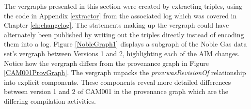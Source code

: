 \begin{figure}
	\centering
\end{figure}
The \glspl{vergraph} presented in this section were created by extracting triples, using the code in Appendix \ref{extractor} from the associated \gls{log} which was covered in Chapter \ref{ch:changelog}.
The statements making up the \gls{vergraph} could have alternately been published by writing out the triples directly instead of encoding them into a \gls{log}.
Figure \ref{NobleGraph1} displays a subgraph of the Noble Gas data set's \gls{vergraph} between Versions 1 and 2, highlighting each of the \gls{AIM} \glspl{change}.
Notice how the \gls{vergraph} differs from the provenance graph in Figure \ref{CAM001ProvGraph}.
The \gls{vergraph} unpacks the \textit{prov:wasRevisionOf} relationship into explicit components.
These components reveal more detailed differences between version 1 and 2 of CAM001 in the provenance graph which are the differing compilation activities.
\begin{figure}
	\centering
\end{figure}
